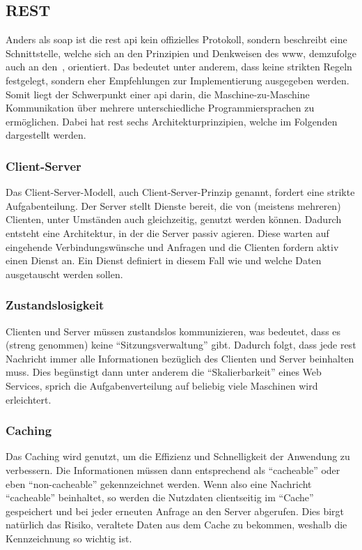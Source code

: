 \subsection{REST}\label{subsec:rest}
	Anders als \gls{soap} ist die \gls{rest} \gls{api} kein offizielles Protokoll,
	sondern beschreibt eine Schnittstelle,
	welche sich an den Prinzipien und Denkweisen des \gls{www},
	demzufolge auch an den~,
	orientiert.
	Das bedeutet unter anderem,
	dass keine strikten Regeln festgelegt,
	sondern eher Empfehlungen zur Implementierung ausgegeben werden.
	Somit liegt der Schwerpunkt einer  \gls{api} darin,
	die Maschine-zu-Maschine Kommunikation über mehrere unterschiedliche Programmiersprachen zu ermöglichen.
	Dabei hat \gls{rest} sechs Architekturprinzipien, welche im Folgenden dargestellt werden.

	\subsubsection{Client-Server}
		Das Client-Server-Modell, auch Client-Server-Prinzip genannt, fordert eine strikte Aufgabenteilung.
		Der Server stellt Dienste bereit, die von (meistens mehreren) Clienten,
		unter Umständen auch gleichzeitig, genutzt werden können.
		Dadurch entsteht eine Architektur,
		in der die Server passiv agieren.
		Diese warten auf eingehende Verbindungswünsche und Anfragen
		und die Clienten fordern aktiv einen Dienst an.
		Ein Dienst definiert in diesem Fall wie
		und welche Daten ausgetauscht werden sollen.

	\subsubsection{Zustandslosigkeit}
		Clienten und Server müssen zustandslos kommunizieren, was bedeutet,
		dass es (streng genommen) keine \enquote{Sitzungsverwaltung} gibt.
		Dadurch folgt, dass jede \gls{rest} Nachricht immer alle Informationen bezüglich des Clienten und Server beinhalten muss.
		Dies begünstigt dann unter anderem die \enquote{Skalierbarkeit} eines Web Services,
		sprich die Aufgabenverteilung auf beliebig viele Maschinen wird erleichtert.

	\subsubsection{Caching}
		Das Caching wird genutzt, um die Effizienz und Schnelligkeit der Anwendung zu verbessern.
		Die Informationen müssen dann entsprechend als \enquote{cacheable} oder eben \enquote{non-cacheable} gekennzeichnet werden.
		Wenn also eine Nachricht \enquote{cacheable} beinhaltet,
		so werden die Nutzdaten clientseitig im \enquote{Cache} gespeichert und bei jeder erneuten Anfrage an den Server abgerufen.
		Dies birgt natürlich das Risiko,
		veraltete Daten aus dem Cache zu bekommen,
		weshalb die Kennzeichnung so wichtig ist.

